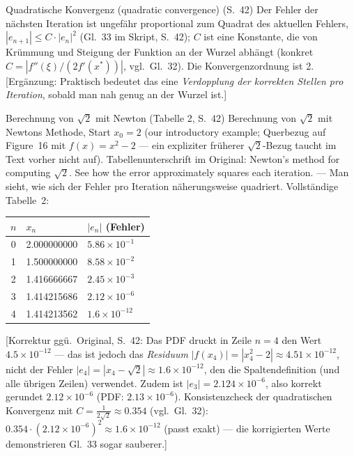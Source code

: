 \begin{defbox}{Quadratische Konvergenz (quadratic convergence) (S.~42)}
Der Fehler der nächsten Iteration ist ungefähr proportional zum Quadrat des aktuellen Fehlers, $|e_{n+1}| \leq C\cdot|e_n|^2$ (Gl.~33 im Skript, S.~42); $C$ ist eine Konstante, die von Krümmung und Steigung der Funktion an der Wurzel abhängt (konkret $C = \left|f''(\xi)/(2f'(x^*))\right|$, vgl.\ Gl.~32). Die Konvergenzordnung ist 2. [Ergänzung: Praktisch bedeutet das eine \emph{Verdopplung der korrekten Stellen pro Iteration}, sobald man nah genug an der Wurzel ist.]
\end{defbox}

\begin{bspbox}{Berechnung von $\sqrt{2}$ mit Newton (Tabelle 2, S.~42)}
Berechnung von $\sqrt{2}$ mit Newtons Methode, Start $x_0 = 2$ (\glqq our introductory example\grqq; Querbezug auf Figure~16 mit $f(x) = x^2 - 2$ — ein expliziter früherer $\sqrt{2}$-Bezug taucht im Text vorher nicht auf). Tabellenunterschrift im Original: \glqq Newton's method for computing $\sqrt{2}$. See how the error approximately squares each iteration.\grqq{} — Man sieht, wie sich der Fehler pro Iteration näherungsweise quadriert. Vollständige Tabelle~2:

\begin{center}
\begin{tabular}{c l l}
\toprule
$n$ & $x_n$ & $|e_n|$ (Fehler) \\
\midrule
0 & 2.000000000 & $5.86 \times 10^{-1}$ \\
1 & 1.500000000 & $8.58 \times 10^{-2}$ \\
2 & 1.416666667 & $2.45 \times 10^{-3}$ \\
3 & 1.414215686 & $2.12 \times 10^{-6}$ \\
4 & 1.414213562 & $1.6 \times 10^{-12}$ \\
\bottomrule
\end{tabular}
\end{center}

[Korrektur ggü.\ Original, S.~42: Das PDF druckt in Zeile $n=4$ den Wert $4.5 \times 10^{-12}$ — das ist jedoch das \emph{Residuum} $|f(x_4)| = |x_4^2 - 2| \approx 4.51 \times 10^{-12}$, nicht der Fehler $|e_4| = |x_4 - \sqrt{2}| \approx 1.6 \times 10^{-12}$, den die Spaltendefinition (und alle übrigen Zeilen) verwendet. Zudem ist $|e_3| = 2.124 \times 10^{-6}$, also korrekt gerundet $2.12 \times 10^{-6}$ (PDF: $2.13 \times 10^{-6}$). Konsistenzcheck der quadratischen Konvergenz mit $C = \frac{1}{2\sqrt{2}} \approx 0.354$ (vgl.\ Gl.~32): $0.354 \cdot (2.12 \times 10^{-6})^2 \approx 1.6 \times 10^{-12}$ (passt exakt) — die korrigierten Werte demonstrieren Gl.~33 sogar sauberer.]


\end{bspbox}
